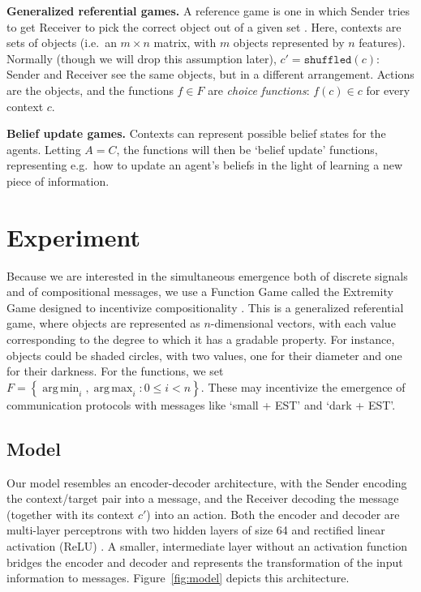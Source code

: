 \documentclass[11pt,a4paper]{article}
\DeclareMathOperator*{\argmax}{arg\,max}
\DeclareMathOperator*{\argmin}{arg\,min}
\newcommand{\nbSST}[1]{{\leavevmode\color{violet}{\scriptsize#1}}}
\begin{document}
\noindent \textbf{Generalized referential games.}  A reference game is one in which Sender tries to get Receiver to pick the correct object out of a given set \citep{Skyrms2010, Lazaridou2017, Lazaridou2018, Havrylov2017, Chaabouni2019a}.  Here, contexts are sets of objects (i.e.\ an $m \times n$ matrix, with $m$ objects represented by $n$ features).  Normally (though we will drop this assumption later), $c' = \texttt{shuffled}(c)$: Sender and Receiver see the same objects, but in a different arrangement. Actions are the objects, and the functions $f \in F$ are \emph{choice functions}: $f(c) \in c$ for every context $c$.

\noindent \textbf{Belief update games.}  Contexts can represent possible belief states for the agents.  Letting $A = C$, the functions will then be `belief update' functions, representing e.g.\ how to update an agent's beliefs in the light of learning a new piece of information. \nbSST{What should we cite here? Something from dynamic semantics?}

\section{Experiment}

Because we are interested in the simultaneous emergence both of discrete signals and of compositional messages, we use a Function Game called the Extremity Game designed to incentivize compositionality \citep{Steinert-Threlkeld2019}.  This is a generalized referential game, where objects are represented as $n$-dimensional vectors, with each value corresponding to the degree to which it has a gradable property.  For instance, objects could be shaded circles, with two values, one for their diameter and one for their darkness.  For the functions, we set $F = \left\{ \argmin_i , \argmax_i : 0 \leq i < n \right\}$.  These may incentivize the emergence of communication protocols with messages like `small + EST' and `dark + EST'.

\subsection{Model}

Our model resembles an encoder-decoder architecture, with the Sender encoding the context/target pair into a message, and the Receiver decoding the message (together with its context $c'$) into an action.  Both the encoder and decoder are multi-layer perceptrons with two hidden layers of size 64 and rectified linear activation (ReLU) \citep{Nair2010, Glorot2011}. A smaller, intermediate layer without an activation function bridges the encoder and decoder and represents the transformation of the input information to messages. Figure~\ref{fig:model} depicts this architecture.
\end{document}

